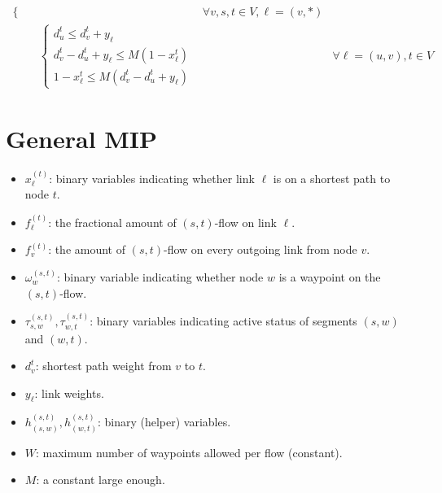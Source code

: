 \documentclass[a4paper,USenglish]{lipics-v2018}
\begin{document}
\begin{align}
\begin{cases*}
\end{cases*}	
&& \forall v,s,t \in V, \ell = (v,*)
\label{LP:equalSplit} 
\\ 
&\begin{cases*}
d^{t}_u \leq d^{t}_v + y_{\ell} \\
d^{t}_v - d^{t}_u + y_{\ell} \leq M(1 - x^t_{\ell})	\\
1 - x^t_{\ell} \leq M(d^{t}_v - d^{t}_u + y_{\ell})
\end{cases*}
&& \forall \ell = (u,v),  t \in V
\label{LP:weights} 
\end{align}


\section{General MIP}
\begin{itemize}
\item	
	$x^{(t)}_{\ell}$:	binary variables indicating whether link $\ell$ is on a shortest path to node $t$.
\item	
	$f^{(t)}_{\ell}$: the fractional amount of $(s,t)$-flow on link $\ell$.
\item	
	$f^{(t)}_{v}$:  the amount of $(s,t)$-flow on every outgoing link from node $v$.
\item
	$\omega^{(s,t)}_{w}$: binary variable indicating whether node $w$ is a waypoint on the $(s,t)$-flow. 
\item $\tau^{(s,t)}_{s,w}, \tau^{(s,t)}_{w,t}$: binary variables indicating active status of segments $(s,w)$ and $(w,t)$.
\item
	$d^{t}_v$: shortest path weight from $v$ to $t$.
\item	
	$y_{\ell}$: link weights.
\item	
	$h^{(s,t)}_{(s,w)}, h^{(s,t)}_{(w,t)}$: binary (helper) variables.
\item
	$W$: maximum  number of waypoints allowed per flow (constant).
\item
	$M$: a constant large enough.	
\end{itemize}
\end{document}
